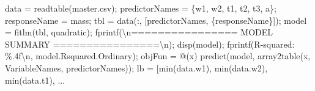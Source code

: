 \documentclass[
  letterpaper,
  DIV=11,
  numbers=noendperiod]{scrartcl}
\newenvironment{Shaded}{\begin{snugshade}}{\end{snugshade}}
\newcommand{\NormalTok}[1]{\textcolor[rgb]{0.00,0.23,0.31}{#1}}
\newcommand{\OperatorTok}[1]{\textcolor[rgb]{0.37,0.37,0.37}{#1}}
\newcommand{\SpecialStringTok}[1]{\textcolor[rgb]{0.13,0.47,0.30}{#1}}
\newcommand{\VariableTok}[1]{\textcolor[rgb]{0.07,0.07,0.07}{#1}}
\begin{document}
\begin{Shaded}
\begin{Highlighting}[]

\VariableTok{data} \OperatorTok{=} \VariableTok{readtable}\NormalTok{(}\SpecialStringTok{\textquotesingle{}master.csv\textquotesingle{}}\NormalTok{)}\OperatorTok{;}
\VariableTok{predictorNames} \OperatorTok{=}\NormalTok{ \{}\SpecialStringTok{\textquotesingle{}w1\textquotesingle{}}\OperatorTok{,} \SpecialStringTok{\textquotesingle{}w2\textquotesingle{}}\OperatorTok{,} \SpecialStringTok{\textquotesingle{}t1\textquotesingle{}}\OperatorTok{,} \SpecialStringTok{\textquotesingle{}t2\textquotesingle{}}\OperatorTok{,} \SpecialStringTok{\textquotesingle{}t3\textquotesingle{}}\OperatorTok{,} \SpecialStringTok{\textquotesingle{}a\textquotesingle{}}\NormalTok{\}}\OperatorTok{;}
\VariableTok{responseName}   \OperatorTok{=} \SpecialStringTok{\textquotesingle{}mass\textquotesingle{}}\OperatorTok{;}
\VariableTok{tbl} \OperatorTok{=} \VariableTok{data}\NormalTok{(}\OperatorTok{:,}\NormalTok{ [}\VariableTok{predictorNames}\OperatorTok{,}\NormalTok{ \{}\VariableTok{responseName}\NormalTok{\}])}\OperatorTok{;}
\VariableTok{model} \OperatorTok{=} \VariableTok{fitlm}\NormalTok{(}\VariableTok{tbl}\OperatorTok{,} \SpecialStringTok{\textquotesingle{}quadratic\textquotesingle{}}\NormalTok{)}\OperatorTok{;}
\VariableTok{fprintf}\NormalTok{(}\SpecialStringTok{\textquotesingle{}\textbackslash{}n================ MODEL SUMMARY ================\textbackslash{}n\textquotesingle{}}\NormalTok{)}\OperatorTok{;}
\VariableTok{disp}\NormalTok{(}\VariableTok{model}\NormalTok{)}\OperatorTok{;}
\VariableTok{fprintf}\NormalTok{(}\SpecialStringTok{\textquotesingle{}R{-}squared: \%.4f\textbackslash{}n\textquotesingle{}}\OperatorTok{,} \VariableTok{model}\NormalTok{.}\VariableTok{Rsquared}\NormalTok{.}\VariableTok{Ordinary}\NormalTok{)}\OperatorTok{;}
\VariableTok{objFun} \OperatorTok{=} \OperatorTok{@}\NormalTok{(}\VariableTok{x}\NormalTok{) }\VariableTok{predict}\NormalTok{(}\VariableTok{model}\OperatorTok{,} \VariableTok{array2table}\NormalTok{(}\VariableTok{x}\OperatorTok{,} \SpecialStringTok{\textquotesingle{}VariableNames\textquotesingle{}}\OperatorTok{,} \VariableTok{predictorNames}\NormalTok{))}\OperatorTok{;}
\VariableTok{lb} \OperatorTok{=}\NormalTok{ [}\VariableTok{min}\NormalTok{(}\VariableTok{data}\NormalTok{.}\VariableTok{w1}\NormalTok{)}\OperatorTok{,} \VariableTok{min}\NormalTok{(}\VariableTok{data}\NormalTok{.}\VariableTok{w2}\NormalTok{)}\OperatorTok{,} \VariableTok{min}\NormalTok{(}\VariableTok{data}\NormalTok{.}\VariableTok{t1}\NormalTok{)}\OperatorTok{,} \OperatorTok{...}

\end{Highlighting}
\end{Shaded}
\end{document}
